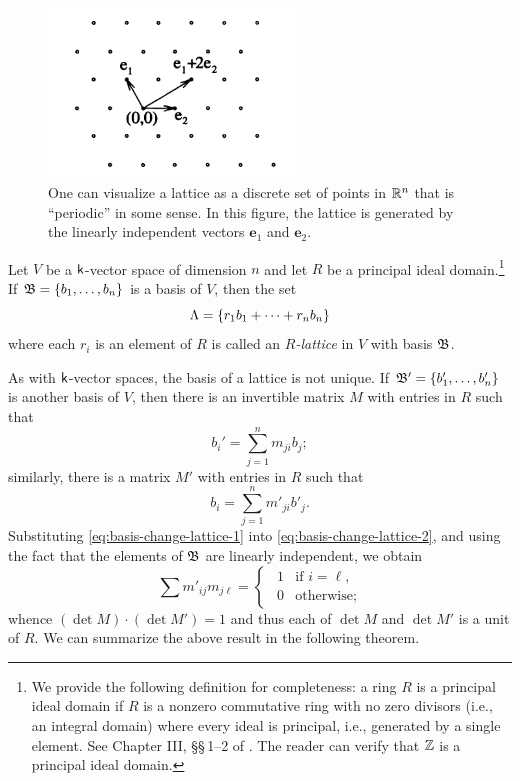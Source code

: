 \begin{figure}[btp]
    \centering
    \includegraphics[width=0.6\textwidth]{assets/lattices.png}
    \caption[Visualizing lattices.]{One can visualize a lattice as a discrete set of points in \(\mathbb{R}^n\) that is ``periodic'' in some sense. In this figure, the lattice is generated by the linearly independent vectors \(\mathbf{e}_1\) and \(\mathbf{e}_2\).\,\cite{conway1997sensual}}
    \label{fig:lattice}
\end{figure}

Let \(V\) be a \(\mathsf{k}\)-vector space of dimension \(n\) and let \(R\) be a principal ideal domain.\footnote{
    We provide the following definition for completeness: a ring \(R\) is a principal ideal domain if \(R\) is a nonzero commutative ring with no zero divisors (i.e., an integral domain) where every ideal is principal, i.e., generated by a single element. See Chapter III, \S\S\,1--2 of \cite{hungerford2012algebra}. The reader can verify that \(\mathbb{Z}\) is a principal ideal domain.
} If \(\mathfrak{B} = \{b_1, \dots, b_n\}\) is a basis of \(V\), then the set
\[
    \Lambda = \{r_1 b_1 + \dots + r_n b_n \}
\]
where each \(r_i\) is an element of \(R\) is called an \emph{\(R\)-lattice} in \(V\) with basis \(\mathfrak{B}\).

As with \(\mathsf{k}\)-vector spaces, the basis of a lattice is not unique. If \(\mathfrak{B}' = \{b_1', \dots, b_n'\}\) is another basis of \(V\), then there is an invertible matrix \(M\) with entries in \(R\) such that
\begin{equation}\label{eq:basis-change-lattice-1}
    b_i' = \sum_{j=1}^n m_{ji} b_j;
\end{equation}
similarly, there is a matrix \(M'\) with entries in \(R\) such that
\begin{equation}\label{eq:basis-change-lattice-2}
    b_i  = \sum_{j=1}^n m'_{ji} b'_j.
\end{equation}
Substituting \eqref{eq:basis-change-lattice-1} into \eqref{eq:basis-change-lattice-2}, and using the fact that the elements of \(\mathfrak{B}\) are linearly independent, we obtain
\[
    \sum m'_{ij}m_{j\ell} =
    \begin{cases}
        \ \ 1 & \text{if } i = \ell,\\
        \ \ 0 & \text{otherwise};
    \end{cases}
\]
whence \((\det M) \cdot (\det M') = 1\) and thus each of \(\det M\) and \(\det M'\) is a unit of \(R\). We can summarize the above result in the following theorem.

